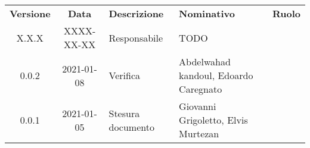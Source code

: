{
    \renewcommand{\arraystretch}{1.5}
    \centering
    \begin{longtable}{ c c  C{3.5cm}  C{3.5cm}  c }
        \rowcolor{\primaryColor}
        \textcolor{\secondaryColor}{
        \textbf{Versione}}     & \textcolor{\secondaryColor}{\textbf{Data}}       & \textcolor{\secondaryColor}
        {\textbf{Descrizione}} & \textcolor{\secondaryColor}{\textbf{Nominativo}} & \textcolor{\secondaryColor}{\textbf{Ruolo}}                          \\


        X.X.X  & 
        XXXX-XX-XX  & 
        Responsabile & 
        TODO & 
        \responsabile{} \\

        0.0.2  & 
        2021-01-08 & 
        Verifica & 
        Abdelwahad kandoul, Edoardo Caregnato & 
        \verificatore{} \\
        
        0.0.1  & 
        2021-01-05 & 
        Stesura documento & 
        Giovanni Grigoletto, Elvis Murtezan  & 
        \redattore{} \\
    \end{longtable}
}